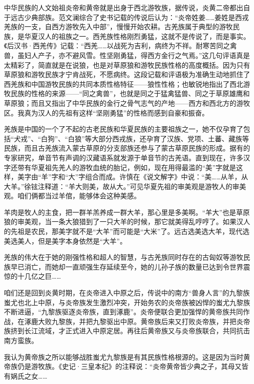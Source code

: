 \par 中华民族的人文始祖炎帝和黄帝就是出身于西北游牧族，据传说，炎黄二帝都出自于远古少典部族。范文澜综合了史书记载的传说后认为：“炎帝姓姜……姜姓是西戎羌族的一支，自西方游牧先入中部”，慢慢开始农耕。古羌族属于典型的游牧民族，是华夏汉人的祖族之一。西羌族性格刚烈勇猛，这就不是传说了，而是事实。《后汉书·西羌传》记载：“西羌……以战死为吉利，病终为不祥。耐寒苦同之禽兽，虽妇人产子，亦不避风雪。性坚刚勇猛，得西方金行之气焉。”这几句评语真是太精彩了，简直就是在说狼，也是对草原狼和游牧民族性格的高度概括。因为只有草原狼和游牧民族才宁肯战死，不愿病终。这段记载和评语极为准确生动地抓住了西羌族和中国游牧民族的共同本质性格特征——狼性性格；也敏锐地指出了西北游牧民族的性格的来源——“同之禽兽”，也就是同之于猛禽猛兽、同之于草原雄鹰和草原狼；而且又指出了中华民族的金行之骨气志气的产地——西方和西北方的游牧区。我真为汉人的先祖有这样“坚刚勇猛”的性格而感到自豪和振奋。
\par 羌族是中国的一个了不起的古老民族和华夏民族的主要祖族之一，她不仅孕育了包括“犬戎”、“白狗”、“白狼”等大部分西戎族，还孕育了汉族、党项、土蕃、藏族等民族，而且古羌族流入蒙古草原的分支部族还参与了蒙古草原民族的形成。据有的专家研究，单音节有声调的汉藏语系就发源于单音节的古羌语。直到现在，许多汉字还带有华夏祖先羌人的游牧血统的胎记，例如，现在用得最滥的“美”字就是这样，美字由“羊”字和“大”字组合而成。许慎在《说文解字》中说：“美……从羊，从大羊。”徐铉注释道：“羊大则美，故从大。”可见华夏先祖的审美观是游牧人的审美观。咱们俩都当过羊倌，能够体会这种美感。
\par 羊肉是牧人的主食，把一群羊羔养成一群大羊，那心里是多美啊。“羊大”也是草原狼的审美观，当一条大狼猎到了一只大羊的时候，那它就美得乱哼哼了。如果汉人的先祖是农民，那美字就不是“大羊”而可能是“大米”了。远古选美选大羊，现代选美选美人，但是美字本身依然是“大羊”。
\par 羌族的伟大在于她的刚强性格和超人的智慧，与古羌族同时存在的古匈奴等游牧民族早已消亡，而她却一直顽强生存延续至今，她的儿孙子族的数量已达到令世界震惊的十几亿之巨……
\par 咱们还是回到炎黄时期，在炎帝进入中原之后，传说中的南方“兽身人言”的九黎族蚩尤也北上中原，与炎帝族发生激烈冲突，开始务农的炎帝族被凶悍的蚩尤九黎族不断进逼，“九黎族驱逐炎帝族，直到涿鹿”。炎帝便联合更加强悍的黄帝族共同作战，在涿鹿大败九黎族，并把九黎驱出中原。黄帝族后来又打败炎帝族，并把炎帝族挤到长江流域，才正式进入中原定居。再往后黄帝族又与炎帝族联合，共同抗击南方蛮族。
\par 我认为黄帝族之所以能够战胜蚩尤九黎族是有其民族性格根源的。这是因为当时黄帝族仍是游牧族。《史记·三皇本纪》的注释说：“炎帝黄帝皆少典之子，其母又皆有娲氏之女……
